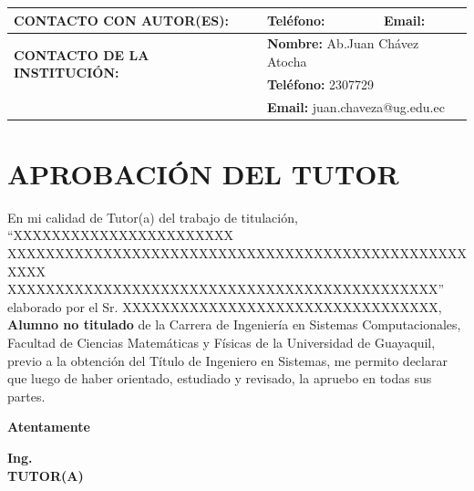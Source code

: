 \documentclass[12pt, a4paper, nofontenc, numbers=endperiod]{apa7}
\begin{document}
{\begin{center}
{\begin{tabular}{|p{1.5cm} l|l|}
					\tabularnewline
					\hline
					\multicolumn{1}{|l|}{\textbf{\footnotesize CONTACTO CON AUTOR(ES):}} & \multicolumn{1}{p{2.5cm}|}{\textbf{\footnotesize Teléfono: \hspace{1.5cm} }} & \multicolumn{1}{p{2.5cm}|}{\textbf{\footnotesize Email:}}\\
					\hline 
					\multirow{2}{9cm}{\textbf{\small CONTACTO DE LA INSTITUCIÓN:}}	& \multicolumn{2}{|p{7cm}|}{\textbf{\footnotesize Nombre:} Ab.Juan Chávez Atocha}\tabularnewline \cline{2-3}
					& \multicolumn{2}{|p{5.5cm}|}{\textbf{\footnotesize Teléfono: }2307729}
					\tabularnewline \cline{2-3}
					& \multicolumn{2}{|p{7cm}|}{\textbf{\footnotesize Email:} juan.chaveza@ug.edu.ec}
					\tabularnewline
					\hline
				\end{tabular}
			}
		\end{center}
	}
	\newpage
	{ %
		\fancyhf{}
		\fancyhead[R]{\thepage}
		\section*{\large \centering APROBACIÓN DEL TUTOR}
		\vspace*{5cm}
		\justify
		En mi calidad de Tutor(a) del trabajo de titulación, ``XXXXXXXXXXXXXXXXXXXXXXX\\       XXXXXXXXXXXXXXXXXXXXXXXXXXXXXXXXXXXXXXXXXXXXXXXXXXXX \\
		XXXXXXXXXXXXXXXXXXXXXXXXXXXXXXXXXXXXXXXXXXXXX'' elaborado por el Sr.                                                                                                                     XXXXXXXXXXXXXXXXXXXXXXXXXXXXXXXXX, \textbf{Alumno no titulado}   de la  Carrera de Ingeniería en Sistemas Computacionales, Facultad de Ciencias Matemáticas y Físicas de la Universidad de Guayaquil,  previo a la obtención del Título de Ingeniero en Sistemas, me permito declarar que luego de haber orientado, estudiado y revisado, la apruebo en todas sus partes.
		\begin{center}
			\textbf{Atentamente}
		\end{center}
		\begin{center}
			\textbf{Ing.} \\
			\textbf{TUTOR(A)}
		\end{center}
		\newpage}
\end{document}
